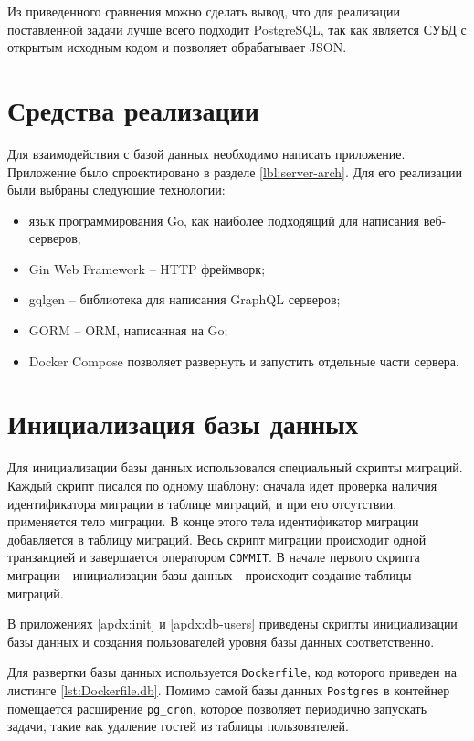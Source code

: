 Из приведенного сравнения можно сделать вывод, что для реализации поставленной задачи лучше всего подходит PostgreSQL, так как является СУБД с открытым исходным кодом и позволяет обрабатывает JSON.

\section{Средства реализации}

Для взаимодействия с базой данных необходимо написать приложение. Приложение было спроектировано в разделе \ref{lbl:server-arch}. Для его реализации были выбраны следующие технологии:
\begin{itemize}
    \item язык программирования Go\cite{golang}, как наиболее подходящий для написания веб-серверов;
    \item Gin Web Framework\cite{gingonic} -- HTTP фреймворк;
    \item gqlgen\cite{gqlgen} -- библиотека для написания GraphQL\cite{graphql} серверов;
    \item GORM\cite{gorm} -- ORM, написанная на Go;
    \item Docker Compose\cite{docker} позволяет развернуть и запустить отдельные части сервера. 
\end{itemize}

\section{Инициализация базы данных}

Для инициализации базы данных использовался специальный скрипты миграций. Каждый скрипт писался по одному шаблону: сначала идет проверка наличия идентификатора миграции в таблице миграций, и при его отсутствии, применяется тело миграции. В конце этого тела идентификатор миграции добавляется в таблицу миграций. Весь скрипт миграции происходит одной транзакцией и завершается оператором \texttt{COMMIT}. В начале первого скрипта миграции - инициализации базы данных - происходит создание таблицы миграций.

В приложениях \ref{apdx:init} и \ref{apdx:db-users} приведены скрипты инициализации базы данных и создания пользователей уровня базы данных соответственно.

Для развертки базы данных используется \texttt{Dockerfile}, код которого приведен на листинге \ref{lst:Dockerfile.db}. Помимо самой базы данных \texttt{Postgres} в контейнер помещается расширение \texttt{pg\_cron}\cite{pgcron}, которое позволяет периодично запускать задачи, такие как удаление гостей из таблицы пользователей.

